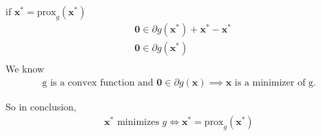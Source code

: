 \documentclass{article}
\begin{document}
\noindent
if \(\bm{x}^* = \text{prox}_g(\bm{x}^*)\)
\begin{align*}
    &\bm{0} \in \partial g(\bm{\bm{x}^*}) + \bm{\bm{x}^*} - \bm{x^*} \\
    &\bm{0} \in \partial g(\bm{\bm{x}^*}) \\
\end{align*}
We know
\begin{align*}
    \text{g is a convex function and } \bm{0} \in \partial g(\bm{x})  \implies \bm{x} \text{ is a minimizer of g.}
\end{align*}

So in conclusion, 
\begin{align*}
     \bm{x}^* \text{ minimizes } g \iff \bm{x}^* = \text{prox}_g(\bm{x}^*)
\end{align*}
\end{document}
